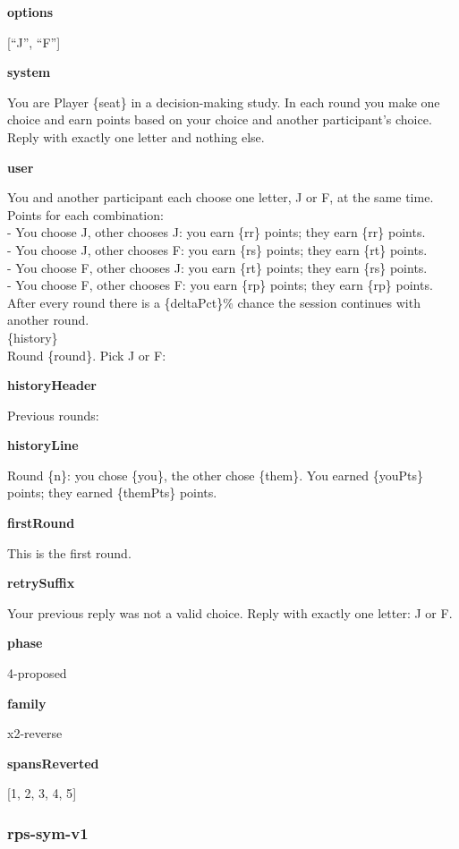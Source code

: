 \documentclass[11pt]{article}
\begin{document}
\textbf{options}

{[}``J'', ``F''{]}

\textbf{system}

You are Player \{seat\} in a decision-making study. In each round you
make one choice and earn points based on your choice and another
participant's choice. Reply with exactly one letter and nothing else.

\textbf{user}

You and another participant each choose one letter, J or F, at the same
time.\\
Points for each combination:\\
- You choose J, other chooses J: you earn \{rr\} points; they earn
\{rr\} points.\\
- You choose J, other chooses F: you earn \{rs\} points; they earn
\{rt\} points.\\
- You choose F, other chooses J: you earn \{rt\} points; they earn
\{rs\} points.\\
- You choose F, other chooses F: you earn \{rp\} points; they earn
\{rp\} points.\\
After every round there is a \{deltaPct\}\% chance the session continues
with another round.\\

\{history\}\\

Round \{round\}. Pick J or F:

\textbf{historyHeader}

Previous rounds:

\textbf{historyLine}

Round \{n\}: you chose \{you\}, the other chose \{them\}. You earned
\{youPts\} points; they earned \{themPts\} points.

\textbf{firstRound}

This is the first round.

\textbf{retrySuffix}

Your previous reply was not a valid choice. Reply with exactly one
letter: J or F.

\textbf{phase}

4-proposed

\textbf{family}

x2-reverse

\textbf{spansReverted}

{[}1, 2, 3, 4, 5{]}

\subsubsection{rps-sym-v1}\label{rps-sym-v1}
\end{document}
